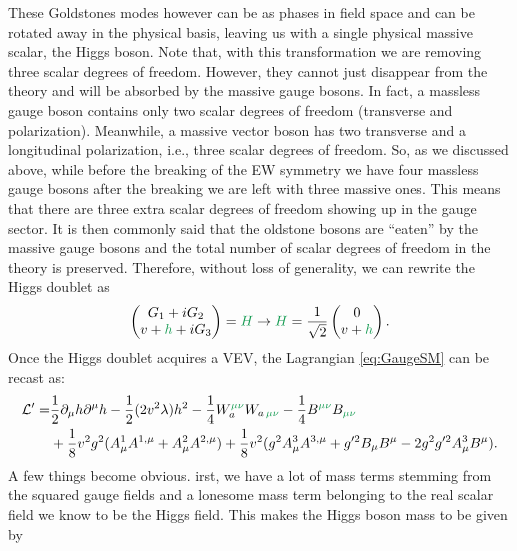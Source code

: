 These Goldstones modes\Joaoadd{,} however\Joaoadd{,} can  be  as phases in  field space and  can be rotated away in the physical basis, leaving us with a single physical massive scalar, the Higgs boson. Note that, with this transformation we are removing three scalar degrees of freedom.  However, they cannot just disappear from the theory and will be absorbed by the massive gauge bosons.
%
In fact, a massless gauge boson contains only two scalar degrees of freedom (transverse and polarization). Meanwhile, a massive vector boson has two transverse and a longitudinal polarization, i.e., three scalar degrees of freedom. So, as we discussed above, while before the breaking of the EW symmetry we have four massless gauge bosons  after the breaking we are left with three massive ones. This means that there are three extra scalar degrees of freedom showing up in the gauge sector. It is then commonly said that the oldstone bosons are ``eaten'' by the massive gauge bosons and the total number of scalar degrees of freedom in the theory is preserved. Therefore, without loss of generality, we can rewrite the Higgs doublet as
%
\begin{equation}
\begin{pmatrix}
G_1 + i G_2 \\ 
v + \Joaoadd{h} + i G_3 
\end{pmatrix} = \Joaoadd{H} \rightarrow \Joaoadd{H}  =  \frac{1}{\sqrt{2}} \begin{pmatrix}
0 \\ 
v + \Joaoadd{h} 
\end{pmatrix}.
\label{shame}%
\end{equation}
Once the Higgs doublet acquires a VEV, the Lagrangian \eqref{eq:GaugeSM} can be recast as:
%
\begin{align}
\mathcal{L}^\prime = & \frac{1}{2} \partial_\mu h \partial^\mu h - \frac{1}{2} (2v^2 \lambda) h^2
- \frac{1}{4}  W^{\Joaoadd{\mu\nu}}_a W_{a \,\Joaoadd{\mu\nu}}  
- \frac{1}{4}  B^{\Joaoadd{\mu\nu}} B_{\Joaoadd{\mu\nu}}  \nonumber \\
& + \frac{1}{8} v^2 g^2 (A^1_\mu A^{1,\mu}+ A^2_\mu A^{2,\mu}) +  \frac{1}{8} v^2  (g^2  A^3_\mu A^{3,\mu} + g^{\prime 2} B_\mu B^\mu - 2 g^2 g^{\prime 2} A^3_\mu B^\mu ). 
\label{complicatedpart}
\end{align}
%
A few things become obvious. irst, we have a lot of mass terms  stemming from the squared gauge fields and a lonesome  mass term belonging to the real scalar field we know to be the Higgs field. This makes the Higgs boson mass  to be given by
